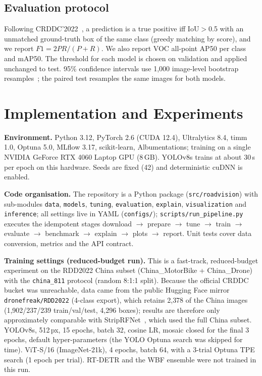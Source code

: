 \IfFileExists{IEEEtran.cls}{\documentclass[conference]{IEEEtran}}%
\begin{document}
\subsection{Evaluation protocol}
Following CRDDC'2022~\cite{crddc2022}, a prediction is a true positive iff IoU$>$0.5 with an unmatched ground-truth box of the same class (greedy matching by score), and we report $F1=2PR/(P+R)$. We also report VOC all-point AP50 per class and mAP50. The threshold for each model is chosen on validation and applied unchanged to test. 95\% confidence intervals use 1{,}000 image-level bootstrap resamples~\cite{efron}; the paired test resamples the same images for both models.

\section{Implementation and Experiments}
\textbf{Environment.} Python 3.12, PyTorch 2.6 (CUDA 12.4), Ultralytics 8.4, timm 1.0, Optuna 5.0, MLflow 3.17, scikit-learn, Albumentations; training on a single NVIDIA GeForce RTX 4060 Laptop GPU (8\,GB). YOLOv8s trains at about 30\,s per epoch on this hardware.
Seeds are fixed (42) and deterministic cuDNN is enabled.

\textbf{Code organisation.} The repository is a Python package (\texttt{src/roadvision}) with sub-modules \texttt{data}, \texttt{models}, \texttt{tuning}, \texttt{evaluation}, \texttt{explain}, \texttt{visualization} and \texttt{inference}; all settings live in YAML (\texttt{configs/}); \texttt{scripts/run\_pipeline.py} executes the idempotent stages download $\rightarrow$ prepare $\rightarrow$ tune $\rightarrow$ train $\rightarrow$ evaluate $\rightarrow$ benchmark $\rightarrow$ explain $\rightarrow$ plots $\rightarrow$ report. Unit tests cover data conversion, metrics and the API contract.

\textbf{Training settings (reduced-budget run).} This is a fast-track, reduced-budget experiment on the RDD2022 China subset (China\_MotorBike + China\_Drone) with the \texttt{china\_811} protocol (random 8:1:1 split). Because the official CRDDC bucket was unreachable, data came from the public Hugging Face mirror \texttt{dronefreak/RDD2022} (4-class export), which retains 2{,}378 of the China images (1{,}902/237/239 train/val/test, 4{,}296 boxes); results are therefore only approximately comparable with StripRFNet~\cite{striprfnet}, which used the full China subset. YOLOv8s, 512\,px, 15 epochs, batch 32, cosine LR, mosaic closed for the final 3 epochs, default hyper-parameters (the YOLO Optuna search was skipped for time). ViT-S/16 (ImageNet-21k), 4 epochs, batch 64, with a 3-trial Optuna TPE search (1 epoch per trial). RT-DETR and the WBF ensemble were not trained in this run.
\end{document}
